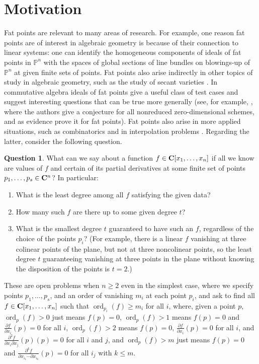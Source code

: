 \documentclass[11pt,twoside]{amsart}
\numberwithin{equation}{section}
\theoremstyle{definition}
\newtheorem{question}[theorem]{Question}
\begin{document}
\section{Motivation}

Fat points are relevant to many areas of research.
For example, one reason
fat points are of interest in algebraic geometry is because of their connection to
linear systems: one can identify the homogeneous components 
of ideals of fat points in ${\mathbb{P}^{n}}$ with the spaces of 
global sections of line bundles on blowings-up of
${\mathbb{P}^{n}}$ at given finite sets of points. Fat points also arise indirectly in other topics of study
in algebraic geometry, such as the study of secant varieties \cite{refCGG}.
In commutative algebra ideals of fat points give a useful class of test cases
and suggest interesting questions that can be true more generally
(see, for example, \cite{refMN}, where the authors give a conjecture
for all nonreduced zero-dimensional schemes, and as evidence 
prove it for fat points).
Fat points also arise in more applied situations, such as combinatorics and 
in interpolation problems \cite{refHS, refI}.
Regarding the latter, consider the following question. 

\begin{question}
What can we say about a function $f\in{\bf C}[x_1,\ldots,x_n]$ if 
all we know are values of $f$ and certain of
its partial derivatives at some finite set of
points $p_1,\ldots,p_s\in{\bf C}^n$? In particular:

\begin{enumerate}
\item What is the least degree among all $f$ satisfying the given data?
\item How many such $f$ are there up to some given degree $t$?
\item What is the smallest degree $t$ guaranteed to have
such an $f$, regardless of the choice of the points $p_i$? (For example,
there is a linear $f$ vanishing at three colinear points of the plane,
but not at three noncolinear points, so the least degree $t$ guaranteeing vanishing
at three points in the plane without knowing the disposition of the points is $t=2$.)
\end{enumerate}
\end{question}

These are open problems when $n\geq 2$ even in the simplest case, where we specify
points $p_1,\ldots,p_s$, and an order of vanishing $m_i$ at each point $p_i$, and ask
to find all $f\in{\bf C}[x_1,\ldots,x_n]$ such that $\operatorname{ord}_{p_i}(f)\geq m_i$
for all $i$, where, given a point $p$, 
$\operatorname{ord}_p(f)>0$ just means $f(p)=0$, 
$\operatorname{ord}_p(f)>1$ means $f(p)=0$ and $\frac{\partial f}{\partial x_i}(p)=0$ for all $i$, 
$\operatorname{ord}_p(f)>2$ means $f(p)=0$, $\frac{\partial f}{\partial x_i}(p)=0$ for all $i$, and 
$\frac{\partial^2 f}{\partial x_i\partial x_j}(p)(p)=0$ for all $i$ and $j$, and 
$\operatorname{ord}_p(f)>m$ just means $f(p)=0$ and 
$\frac{\partial^k f}{\partial x_{i_1}\cdots \partial x_{i_k}}(p)=0$
for all $i_j$ with $k\leq m$.
\end{document}
